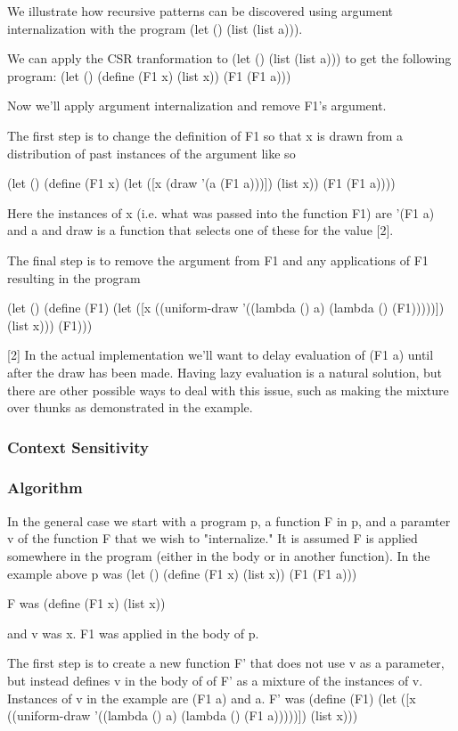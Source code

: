 \documentclass[a4paper,10pt]{article}
\begin{document}
We illustrate how recursive patterns can be discovered using argument internalization with the program (let () (list (list a))).

We can apply the CSR tranformation to (let () (list (list a))) to get the following program:
(let ()
  (define (F1 x)
    (list x))
  (F1 (F1 a)))

Now we'll apply argument internalization and remove F1's argument.

The first step is to change the definition of F1 so that x is drawn from a distribution of past instances of the argument like so

(let ()
  (define (F1 x)
    (let ([x (draw '(a (F1 a)))])
      (list x))
  (F1 (F1 a))))

Here the instances of x (i.e. what was passed into the function F1) are '(F1 a) and a and draw is a function that selects one of these for the value [2].

The final step is to remove the argument from F1 and any applications of F1 resulting in the program

(let ()
  (define (F1)
    (let ([x ((uniform-draw '((lambda () a) (lambda () (F1)))))])
      (list x)))
  (F1)))

[2] In the actual implementation we'll want to delay evaluation of (F1 a) until after the draw has been made.  Having lazy evaluation is a natural solution, but there are other possible ways to deal with this issue, such as making the mixture over thunks as demonstrated in the example.
\subsubsection{Context Sensitivity}
\subsubsection{Algorithm}
In the general case we start with a program p, a function F in p, and a paramter v of the function F that we wish to "internalize." It is assumed F is applied somewhere in the program (either in the body or in another function).  In the example above p was 
(let ()
  (define (F1 x)
    (list x))
  (F1 (F1 a)))

F was
(define (F1 x)
    (list x))

and v was x.  F1 was applied in the body of p.

The first step is to create a new function F' that does not use v as a parameter, but instead defines v in the body of of F' as a mixture of the instances of v.  Instances of v in the example are (F1 a) and a.  F' was
(define (F1)
    (let ([x ((uniform-draw '((lambda () a) (lambda () (F1 a)))))])
      (list x)))
\end{document}
